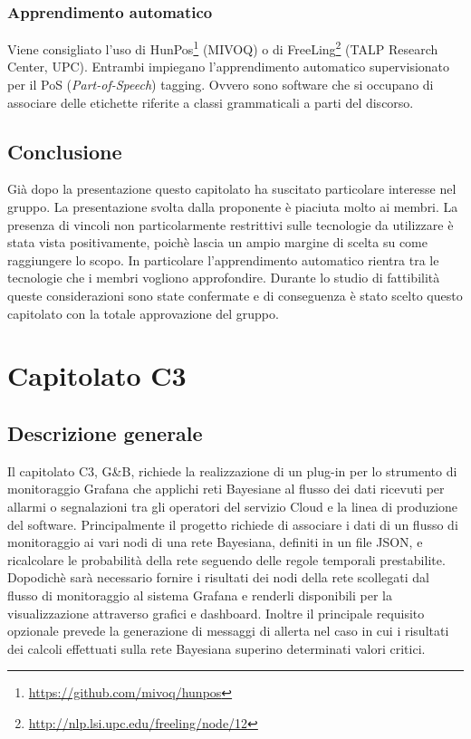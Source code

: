 \documentclass[11pt,a4paper]{article}
\begin{document}
	\subsubsection{Apprendimento automatico}
		Viene consigliato l'uso di HunPos\footnote{\url{https://github.com/mivoq/hunpos}} (MIVOQ) o di FreeLing\footnote{\url{ http://nlp.lsi.upc.edu/freeling/node/12}} (TALP Research Center, UPC). Entrambi impiegano l'apprendimento automatico supervisionato per il PoS (\textit{Part-of-Speech}) tagging. Ovvero sono software che si occupano di associare delle etichette riferite a classi grammaticali a parti del discorso. 
		\subsection{Conclusione}
		Già dopo la presentazione questo capitolato ha suscitato particolare interesse nel gruppo. La presentazione svolta dalla proponente è piaciuta molto ai membri. La presenza di vincoli non particolarmente restrittivi sulle tecnologie da utilizzare è stata vista positivamente, poichè lascia un ampio margine di scelta su come raggiungere lo scopo. In particolare l'apprendimento automatico rientra tra le tecnologie che i membri vogliono approfondire. Durante lo studio di fattibilità queste considerazioni sono state confermate e di conseguenza è stato scelto questo capitolato con la totale approvazione del gruppo. 
		\newpage
		\section{Capitolato C3}
	\subsection{Descrizione generale}
Il capitolato C3, G\&B, richiede la realizzazione di un plug-in per lo strumento di monitoraggio Grafana che applichi reti Bayesiane al flusso dei dati ricevuti per allarmi o segnalazioni tra gli operatori del servizio Cloud e la linea di produzione del software.
Principalmente il progetto richiede di associare i dati di un flusso di monitoraggio ai vari nodi di una rete Bayesiana, definiti in un file JSON, e ricalcolare le probabilità della rete seguendo delle regole temporali prestabilite.
Dopodichè sarà necessario fornire i risultati dei nodi della rete scollegati dal flusso di monitoraggio al sistema Grafana e renderli disponibili per la visualizzazione attraverso grafici e dashboard.
Inoltre il principale requisito opzionale prevede la generazione di messaggi di allerta nel caso in cui i risultati dei calcoli effettuati sulla rete Bayesiana superino determinati valori critici.
\end{document}
